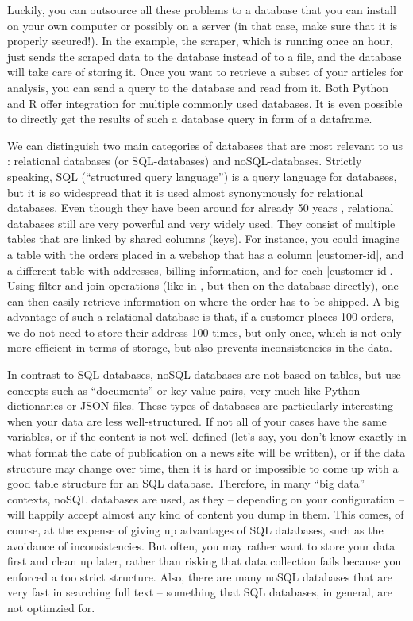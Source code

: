 Luckily, you can outsource all these problems to a database that you can
install on your own computer or possibly on a server (in that case, make
sure that it is properly secured!). In the example, the scraper, which
is running once an hour, just sends the scraped data to the database
instead of to a file, and the database will take care of storing it.
Once you want to retrieve a subset of your articles for analysis,
you can send a query to the database and read from it. Both Python and
R offer integration for multiple commonly used databases. It is even
possible to directly get the results of such a database query in
form of a dataframe.

We can distinguish two main categories of databases
that are most relevant to us \citep[see also][]{Gunther2018}:
relational databases (or SQL-databases) and noSQL-databases. Strictly
speaking, SQL (``structured query language'') is a query language for
databases, but it is so widespread that it is used almost synonymously
for relational databases. Even though they have been around for
already 50 years \citep{Codd1970}, relational databases still are very
powerful and very widely used.  They consist of multiple tables that
are linked by shared columns (keys). For instance, you could imagine a
table with the orders placed in a webshop that has a column
|customer-id|, and a different table with addresses, billing
information, and for each |customer-id|. Using filter and join
operations (like in , but then on the database directly), one can then easily retrieve
information on where the order has to be shipped. A big advantage of
such a relational database is that, if a customer places 100 orders,
we do not need to store their address 100 times, but only once, which
is not only more efficient in terms of storage, but also prevents
inconsistencies in the data.

In contrast to SQL databases, noSQL databases are not based on tables,
but use concepts such as ``documents'' or key-value pairs, very much
like Python dictionaries or JSON files. These types of databases are
particularly interesting when your data are less well-structured. If
not all of your cases have the same variables, or if the content is not
well-defined (let's say, you don't know exactly in what format the date
of publication on a news site will be written), or if the data structure
may change over time, then it is hard or impossible to come up with a
good table structure for an SQL database. Therefore, in many ``big data''
contexts, noSQL databases are used, as they -- depending on your
configuration -- will happily accept almost any kind of content you dump
in them. This comes, of course, at the expense of giving up advantages
of SQL databases, such as the avoidance of inconsistencies. But often,
you may rather want to store your data first and clean up later, rather
than risking that data collection fails because you enforced a too strict
structure. Also, there are many noSQL databases that are very fast in
searching full text -- something that SQL databases, in general, are
not optimzied for.


